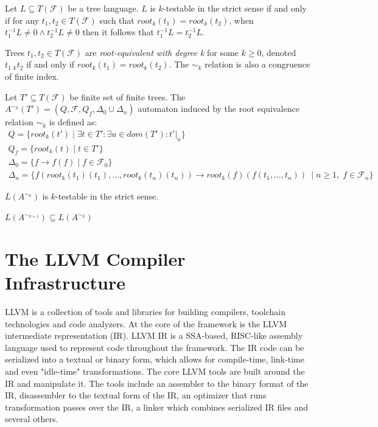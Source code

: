 \begin{thm}
Let $L \subseteq T(\mathcal{F})$ be a tree language. $L$ is $k$-testable in the strict sense if and only if for any $t_1, t_2 \in T(\mathcal{F})$ such that $root_k(t_1) = root_k(t_2)$, when $t_1^{-1}L \neq 0 \wedge t_2^{-1}L \neq 0$ then it follows that $t_1^{-1}L = t_2^{-1}L$.
\end{thm}

\begin{defn}
Trees $t_1, t_2 \in T(\mathcal{F})$ are \emph{root-equivalent with degree k} for some $k \geq 0$, denoted $t_1 ~_k t_2$ if and only if $root_k(t_1) = root_k(t_2)$. The $\sim_k$ relation is also a congruence of finite index.
\end{defn}

\begin{defn}
Let $T' \subseteq T(\mathcal{F})$ be finite set of finite trees. The $A^{\sim_k}(T') = (Q, \mathcal{F}, Q_f, \Delta_0 \cup \Delta_n)$ automaton induced by the root equivalence relation $\sim_k$ is defined as:
\begin{gather*}
    Q = \{root_k(t') \; | \; \exists t \in T': \exists u \in dom(T'): t'|_u\}\\
    Q_f = \{root_k(t) \; | \; t \in T'\}\\
    \Delta_0 = \{f \rightarrow f(f) \; | \; f \in \mathcal{F}_0\}\\
    \Delta_n = \{f(root_k(t_1)(t_1), \dots, root_k(t_n)(t_n)) \rightarrow root_k(f)(f(t_1, \dots, t_n))\ \; | \; n \geq 1, \; f \in \mathcal{F}_n\}
\end{gather*}
\end{defn}

\begin{thm}
$L(A^{\sim_k})$ is $k$-testable in the strict sense.
\end{thm}

\begin{thm}
$L(A^{\sim_{k+1}}) \subseteq L(A^{\sim_k})$
\end{thm}

\section{The {LLVM} Compiler Infrastructure}
{LLVM} is a collection of tools and libraries for building compilers, toolchain technologies and code analyzers. At the core of the framework is the {LLVM} intermediate representation (IR). {LLVM IR} is a SSA-based, RISC-like assembly language used to represent code throughout the framework. The IR code can be serialized into a textual or binary form, which allows for compile-time, link-time and even "idle-time" transformations. The core {LLVM} tools are built around the IR and manipulate it. The tools include an assembler to the binary format of the IR, disassembler to the textual form of the IR, an optimizer that runs transformation passes over the IR, a linker which combines serialized IR files and several others.

